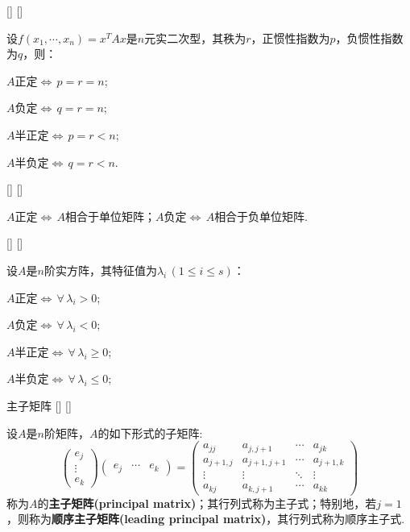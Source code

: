 \documentclass[UTF8]{ctexart}
\begin{document}
		\begin{ppt}
			[]
			{}
			[]
			[]
			
			设$f(x_1,\cdots,x_n)=x^{T}Ax$是$n$元实二次型，其秩为$r$，正惯性指数为$p$，负惯性指数为$q$，则：

			$A$正定$\iff\,p=r=n$;

			$A$负定$\iff\,q=r=n$;

			$A$半正定$\iff\,p=r<n$;

			$A$半负定$\iff\,q=r<n$.
		\end{ppt}

		\begin{ppt}
			[]
			{}
			[]
			[]
			
			$A$正定$\iff\,A$相合于单位矩阵；$A$负定$\iff\,A$相合于负单位矩阵.
		\end{ppt}

		\begin{ppt}
			[]
			{}
			[]
			[]
			
			设$A$是$n$阶实方阵，其特征值为$\lambda_i\,(1\leqslant i\leqslant s)$：

			$A$正定$\iff\,\forall\,\lambda_i>0$;

			$A$负定$\iff\,\forall\,\lambda_i<0$;

			$A$半正定$\iff\,\forall\,\lambda_i\geqslant 0$;

			$A$半负定$\iff\,\forall\,\lambda_i\leqslant 0$;
		\end{ppt}

		\begin{dfn}
			[]
			{主子矩阵}
			[]
			[]
			
			设$A$是$n$阶矩阵，$A$的如下形式的子矩阵:\[ \begin{pmatrix}
				e_j\\\vdots\\e_k
			\end{pmatrix}\begin{pmatrix}
				e_j&\cdots&e_k
			\end{pmatrix}=
			\begin{pmatrix}
				a_{jj}&a_{j,j+1}&\cdots&a_{jk}\\a_{j+1,j}&a_{j+1,j+1}&\cdots&a_{j+1,k}\\\vdots&\vdots&\ddots&\vdots \\a_{kj}&a_{k,j+1}&\cdots&a_{kk}
			\end{pmatrix}
			\]
			称为$A$的\textbf{主子矩阵(principal matrix)}；其行列式称为主子式；特别地，若$j=1$，则称为\textbf{顺序主子矩阵(leading principal matrix)}，其行列式称为顺序主子式.
		\end{dfn}
\end{document}
